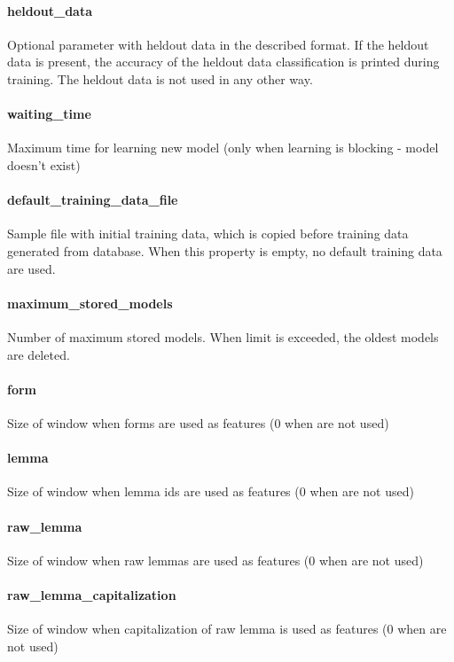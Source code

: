 \paragraph{heldout\_data}
Optional parameter with heldout data in the described format. If the heldout data
is present, the accuracy of the heldout data classification is printed during
training. The heldout data is not used in any other way.

\paragraph{waiting\_time}
Maximum time for learning new model (only when learning is blocking - model doesn't exist)

\paragraph{default\_training\_data\_file}
Sample file with initial training data, which is copied before training data
generated from database. When this property is empty, no default training data
are used.

\paragraph{maximum\_stored\_models}
Number of maximum stored models. When limit is exceeded, the oldest models are deleted.

\paragraph{form}
Size of window when forms are used as features (0 when are not used)

\paragraph{lemma}
Size of window when lemma ids are used as features (0 when are not used)

\paragraph{raw\_lemma}
Size of window when raw lemmas are used as features (0 when are not used)

\paragraph{raw\_lemma\_capitalization}
Size of window when capitalization of raw lemma is used as features (0 when are not used)

